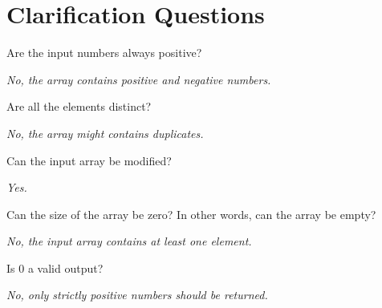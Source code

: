 \section{Clarification Questions}

\begin{QandA}
	\begin{questionitem} \begin{question} Are the input numbers always positive?  \end{question} 	 
    \begin{answered}
		\textit{No, the array contains positive and negative numbers.}
	\end{answered} \end{questionitem}

	\begin{questionitem} \begin{question} Are all the elements distinct?  \end{question} 	 
    \begin{answered}
		\textit{No, the array might contains duplicates.}
	\end{answered} \end{questionitem}
	
	\begin{questionitem} \begin{question} Can the input array be modified?  \end{question} 	 
    \begin{answered}
		\textit{Yes.}
	\end{answered} \end{questionitem}

	\begin{questionitem} \begin{question} Can the size of the array be zero? In other words, can the array be empty?  \end{question} 	 
    \begin{answered}
		\textit{No, the input array contains at least one element.}
	\end{answered} \end{questionitem}

	\begin{questionitem} \begin{question} Is $0$ a valid output?  \end{question} 	 
    \begin{answered}
		\textit{No, only strictly positive numbers should be returned.}
	\end{answered} \end{questionitem}

\end{QandA}


